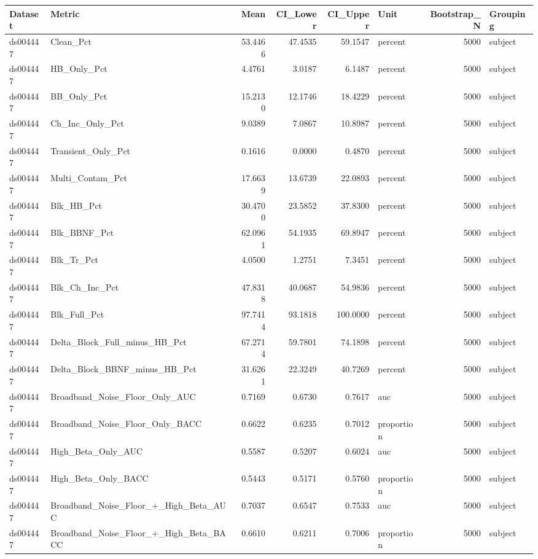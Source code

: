 \begin{tabular}{llrrrlrl}
\toprule
Dataset & Metric & Mean & CI_Lower & CI_Upper & Unit & Bootstrap_N & Grouping \\
\midrule
ds004447 & Clean_Pct & 53.4466 & 47.4535 & 59.1547 & percent & 5000 & subject \\
ds004447 & HB_Only_Pct & 4.4761 & 3.0187 & 6.1487 & percent & 5000 & subject \\
ds004447 & BB_Only_Pct & 15.2130 & 12.1746 & 18.4229 & percent & 5000 & subject \\
ds004447 & Ch_Inc_Only_Pct & 9.0389 & 7.0867 & 10.8987 & percent & 5000 & subject \\
ds004447 & Transient_Only_Pct & 0.1616 & 0.0000 & 0.4870 & percent & 5000 & subject \\
ds004447 & Multi_Contam_Pct & 17.6639 & 13.6739 & 22.0893 & percent & 5000 & subject \\
ds004447 & Blk_HB_Pct & 30.4700 & 23.5852 & 37.8300 & percent & 5000 & subject \\
ds004447 & Blk_BBNF_Pct & 62.0961 & 54.1935 & 69.8947 & percent & 5000 & subject \\
ds004447 & Blk_Tr_Pct & 4.0500 & 1.2751 & 7.3451 & percent & 5000 & subject \\
ds004447 & Blk_Ch_Inc_Pct & 47.8318 & 40.0687 & 54.9836 & percent & 5000 & subject \\
ds004447 & Blk_Full_Pct & 97.7414 & 93.1818 & 100.0000 & percent & 5000 & subject \\
ds004447 & Delta_Block_Full_minus_HB_Pct & 67.2714 & 59.7801 & 74.1898 & percent & 5000 & subject \\
ds004447 & Delta_Block_BBNF_minus_HB_Pct & 31.6261 & 22.3249 & 40.7269 & percent & 5000 & subject \\
ds004447 & Broadband_Noise_Floor_Only_AUC & 0.7169 & 0.6730 & 0.7617 & auc & 5000 & subject \\
ds004447 & Broadband_Noise_Floor_Only_BACC & 0.6622 & 0.6235 & 0.7012 & proportion & 5000 & subject \\
ds004447 & High_Beta_Only_AUC & 0.5587 & 0.5207 & 0.6024 & auc & 5000 & subject \\
ds004447 & High_Beta_Only_BACC & 0.5443 & 0.5171 & 0.5760 & proportion & 5000 & subject \\
ds004447 & Broadband_Noise_Floor_+_High_Beta_AUC & 0.7037 & 0.6547 & 0.7533 & auc & 5000 & subject \\
ds004447 & Broadband_Noise_Floor_+_High_Beta_BACC & 0.6610 & 0.6211 & 0.7006 & proportion & 5000 & subject \\

\end{tabular}
